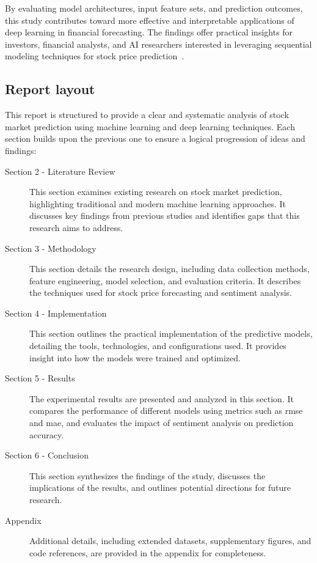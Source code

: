 By evaluating model architectures, input feature sets, and prediction outcomes, this study contributes
toward more effective and interpretable applications of deep learning in financial forecasting. The 
findings offer practical insights for investors, financial analysts, and AI researchers interested in 
leveraging sequential modeling techniques for stock price 
prediction~\parencite{balasubramanian2023SystematicSurvey, shaban2024SMPDL, guo2024LSTMStock, 
agrawal2022StockPrediction}.

\subsection{Report layout}

This report is structured to provide a clear and systematic analysis of stock 
market prediction using machine learning and deep learning techniques. Each 
section builds upon the previous one to ensure a logical progression of ideas 
and findings:

\begin{description}
\item [Section 2 - Literature Review] This section examines existing research 
on stock market prediction, highlighting traditional and modern machine 
learning approaches. It discusses key findings from previous studies and 
identifies gaps that this research aims to address.
\item [Section 3 - Methodology] This section details the research design, 
including data collection methods, feature engineering, model selection, and 
evaluation criteria. It describes the techniques used for stock price
forecasting and sentiment analysis.
\item[Section 4 - Implementation] This section outlines the practical 
implementation of the predictive models, detailing the tools, 
technologies, and configurations used. It provides insight into how the
models were trained and optimized.
\item[Section 5 - Results] The experimental results are presented and analyzed 
in this section. It compares the performance of different models using metrics 
such as \acrshort{rmse} and \acrshort{mae}, and evaluates the impact of 
sentiment analysis on prediction accuracy.
\item[Section 6 - Conclusion] This section synthesizes the findings of the 
study, discusses the implications of the results, and outlines potential 
directions for future research.
\item[Appendix] Additional details, including extended datasets, supplementary 
figures, and code references, are provided in the appendix for completeness.
\end{description}



